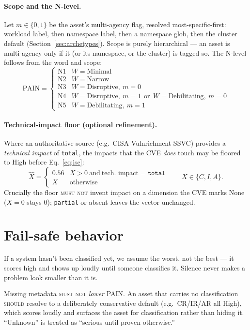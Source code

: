 \documentclass[11pt]{article}
\newcommand{\code}[1]{\texttt{#1}}
\newcommand{\rfckw}[1]{\textsc{#1}}
\begin{document}
\paragraph{Scope and the N-level.}
Let $m \in \{0,1\}$ be the asset's multi-agency flag, resolved most-specific-first:
workload label, then namespace label, then a namespace glob, then the cluster
default (Section~\ref{sec:archetypes}). Scope is purely hierarchical --- an asset is
multi-agency only if it (or its namespace, or the cluster) is tagged so. The N-level
follows from the word and scope:
\begin{equation}
\text{PAIN} =
\begin{cases}
\text{N1} & W=\text{Minimal} \\
\text{N2} & W=\text{Narrow} \\
\text{N3} & W=\text{Disruptive},\ m=0 \\
\text{N4} & W=\text{Disruptive},\ m=1 \ \ \text{or}\ \ W=\text{Debilitating},\ m=0 \\
\text{N5} & W=\text{Debilitating},\ m=1
\end{cases}
\label{eq:pain}
\end{equation}

\paragraph{Technical-impact floor (optional refinement).}
Where an authoritative source (e.g.\ CISA Vulnrichment SSVC) provides a
\emph{technical impact} of \code{total}, the impacts that the CVE \emph{does} touch
may be floored to High before Eq.~\eqref{eq:isc}:
\[
\hat{X} = \begin{cases} 0.56 & X>0 \ \text{and}\ \text{tech.\ impact}=\code{total} \\ X & \text{otherwise} \end{cases}
\qquad X \in \{C,I,A\}.
\]
Crucially the floor \rfckw{must not} invent impact on a dimension the CVE marks
None ($X=0$ stays $0$); \code{partial} or absent leaves the vector unchanged.

\section{Fail-safe behavior}
\begin{plain}
If a system hasn't been classified yet, we assume the worst, not the best --- it
scores high and shows up loudly until someone classifies it. Silence never makes a
problem look smaller than it is.
\end{plain}
Missing metadata \rfckw{must not} \emph{lower} PAIN. An asset that carries no
classification \rfckw{should} resolve to a deliberately conservative default
(e.g.\ CR/IR/AR all High), which scores loudly and surfaces the asset for
classification rather than hiding it. ``Unknown'' is treated as ``serious until
proven otherwise.''
\end{document}
